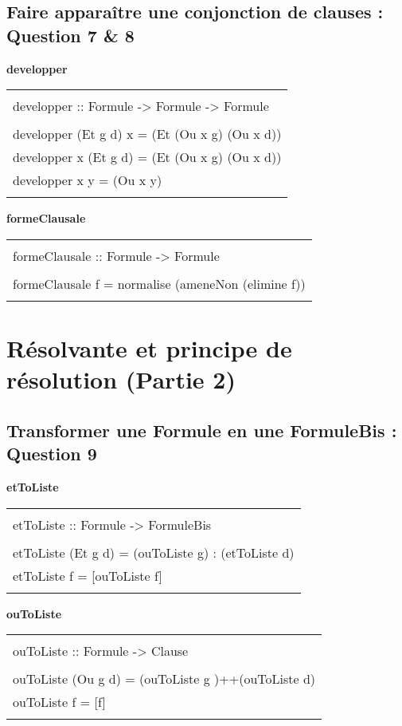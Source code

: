 \documentclass{article}
\newenvironment{code}[1]
    {\begin{center}
    \textbf{#1\\[1ex]}
    \begin{tabular}{|p{0.9\textwidth}|}
    \hline\\
    }
    { 
    \\\\\hline
    \end{tabular} 
    \end{center}
    }
\begin{document}
\subsection{Faire apparaître une conjonction de clauses : Question 7 \& 8}
\begin{code}{developper}
    developper :: Formule -> Formule -> Formule\\
    \\
    developper (Et g d) x = (Et (Ou x g) (Ou x d))\\
    developper x (Et g d) = (Et (Ou x g) (Ou x d))\\
    developper x y = (Ou x y)
\end{code}
\begin{code}{formeClausale}
    formeClausale :: Formule -> Formule\\
    \\
    formeClausale f = normalise (ameneNon (elimine f))
\end{code}
\newpage

\section{Résolvante et principe de résolution (Partie 2)}

\subsection{Transformer une Formule en une FormuleBis : Question 9}
\begin{code}{etToListe}
    etToListe :: Formule -> FormuleBis\\
    \\
    etToListe (Et g d) = (ouToListe g) : (etToListe d)\\
    etToListe f = [ouToListe f]
\end{code}
\begin{code}{ouToListe}
    ouToListe :: Formule -> Clause\\
    \\
    ouToListe (Ou g d) = (ouToListe g )++(ouToListe d)\\
    ouToListe f = [f]
\end{code}
\end{document}
